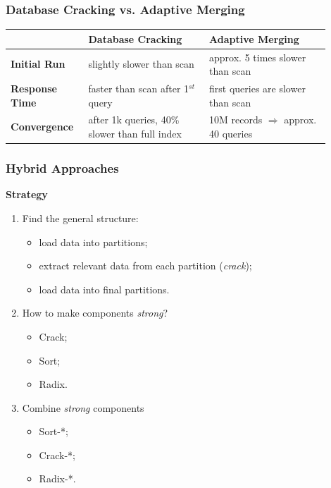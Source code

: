 \documentclass{beamer}
\begin{document}
\begin{frame}
\frametitle{Database Cracking vs. Adaptive Merging}
\begin{tabular}{| M{0.2\linewidth} | M{0.35\linewidth} | M{0.35\linewidth} |}
\hline 
 & \textbf{Database Cracking} & \textbf{Adaptive Merging} \\ 
\hline 
\textbf{Initial Run} & \color{green} slightly slower than scan & \color{red} approx. 5 times slower than scan \\ 
\hline 
\textbf{Response Time} & \color{green} faster than scan after 1$^{st}$ query & \color{red} first queries are slower than scan \\ 
\hline 
\textbf{Convergence} & \color{red} after 1k queries, 40\% slower than full index & \color{green} 10M records $\Rightarrow$ approx. 40 queries \\ 
\hline 
\end{tabular} 
\end{frame}

\begin{frame}
\frametitle{Hybrid Approaches}
\textbf{Strategy} \pause
\begin{enumerate}
\item{Find the general structure:}
\begin{itemize}
\item{load data into partitions;}
\item{extract relevant data from each partition (\textit{crack});}
\item{load data into final partitions.}
\end{itemize}
\pause
\item{How to make components \textit{strong}?}
\begin{itemize}
\item{Crack;}
\item{Sort;}
\item{Radix.}
\end{itemize}
\pause
\item{Combine \textit{strong} components}
\begin{itemize}
\item{Sort-*;}
\item{Crack-*;}
\item{Radix-*.}
\end{itemize}
\end{enumerate}
\end{frame}
\end{document}
